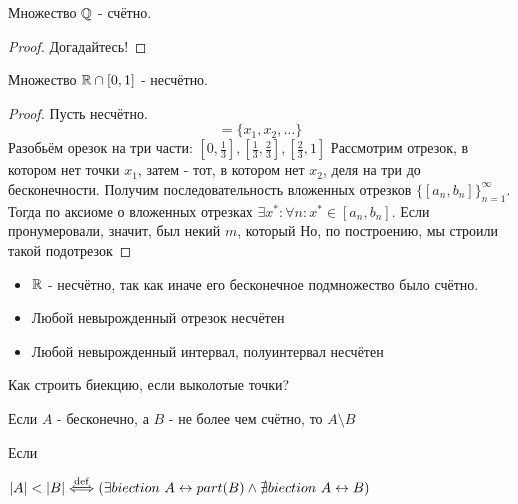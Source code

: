 \documentclass[12pt, a4paper]{article}
\begin{document}
  \begin{theorem}
  Множество ${\mathbb{Q}}$ - счётно.
  \end{theorem}
  \begin{proof}
  Догадайтесь!
  \end{proof}

  \begin{theorem}
  Множество ${\mathbb{R}} \cap [0, 1]$ - несчётно.
  \end{theorem}
  \begin{proof}
  Пусть несчётно.
  \begin{equation}
    [0, 1] = \{x_1, x_2, \ldots\}
  \end{equation}
  Разобьём орезок на три части: 
  $\left[0, \frac{1}{3}\right], \left[\frac{1}{3}, \frac{2}{3}\right], \left[\frac{2}{3}, 1\right]$
  Рассмотрим отрезок, в котором нет точки $x_1$, затем - тот, в котором нет $x_2$, деля на три до бесконечности.
  Получим последовательность вложенных отрезков $\{[a_n, b_n]\}^{\infty}_{n = 1}$.
  Тогда по аксиоме о вложенных отрезках $\exists x^{*}: \forall n: x^{*} \in [a_n, b_n]$.
  Если пронумеровали, значит, был некий $m$, который 
  Но, по построению, мы строили такой подотрезок 
  \end{proof}

  \begin{corollary}
  \begin{itemize}
    \item ${\mathbb{R}}$ - несчётно, так как иначе его бесконечное подмножество было счётно.
    \item Любой невырожденный отрезок несчётен
    \item Любой невырожденный интервал, полуинтервал несчётен
  \end{itemize}
  \end{corollary}

  Как строить биекцию, если выколотые точки?

  \begin{statement}
  Если $A$ - бесконечно, а $B$ - не более чем счётно, то $A \setminus B$
  \end{statement}

  \begin{property}
  Если
  \end{property}

  \begin{definition}[$|A| < |B|$]
  $|A| < |B| \overset{\mathrm{def}}{\Longleftrightarrow} (\exists biection ~ A \leftrightarrow part(B) \land \nexists biection ~ A \leftrightarrow B)$

  \end{definition}
\end{document}
